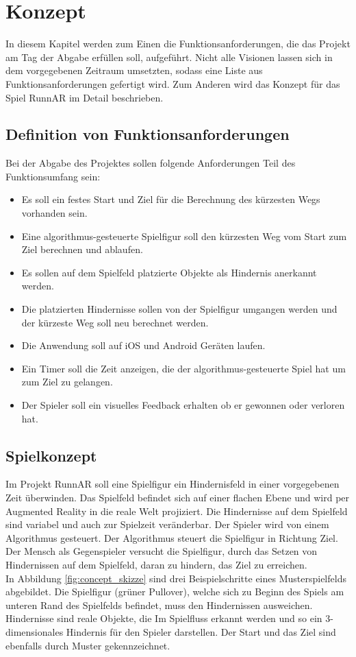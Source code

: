 \chapter{Konzept}
\label{sec:conzept}
In diesem Kapitel werden zum Einen die Funktionsanforderungen, die das Projekt am Tag der Abgabe erfüllen soll, aufgeführt. Nicht alle Visionen lassen sich in dem vorgegebenen Zeitraum umsetzten, sodass eine Liste aus Funktionsanforderungen gefertigt wird. Zum Anderen wird das Konzept für das Spiel RunnAR im Detail beschrieben.

\section{Definition von Funktionsanforderungen}
Bei der Abgabe des Projektes sollen folgende Anforderungen Teil des Funktionsumfang sein:
\begin{itemize}
\item Es soll ein festes Start und Ziel für die Berechnung des kürzesten Wegs vorhanden sein.
\item Eine algorithmus-gesteuerte Spielfigur soll den kürzesten Weg vom Start zum Ziel berechnen und ablaufen.
\item Es sollen auf dem Spielfeld platzierte Objekte als Hindernis anerkannt werden.
\item Die platzierten Hindernisse sollen von der Spielfigur umgangen werden und der kürzeste Weg soll neu berechnet werden.
\item Die Anwendung soll auf iOS und Android Geräten laufen.
\item Ein Timer soll die Zeit anzeigen, die der algorithmus-gesteuerte Spiel hat um zum Ziel  zu gelangen.
\item Der Spieler soll ein visuelles Feedback erhalten ob er gewonnen oder verloren hat.
\end{itemize}

\section{Spielkonzept}
Im Projekt RunnAR soll eine Spielfigur ein Hindernisfeld in einer vorgegebenen Zeit überwinden. Das Spielfeld befindet sich auf einer flachen Ebene und wird per Augmented Reality in die reale Welt projiziert. Die Hindernisse auf dem Spielfeld sind variabel und auch zur Spielzeit veränderbar. Der Spieler wird von einem Algorithmus gesteuert. Der Algorithmus steuert die Spielfigur in Richtung Ziel. Der Mensch als Gegenspieler versucht die Spielfigur, durch das Setzen von Hindernissen auf dem Spielfeld, daran zu hindern, das Ziel zu erreichen.\\
In Abbildung \ref{fig:concept_skizze} sind drei Beispielschritte eines Musterspielfelds abgebildet. Die Spielfigur (grüner Pullover), welche sich zu Beginn des Spiels am unteren Rand des Spielfelds befindet, muss den Hindernissen ausweichen. Hindernisse sind reale Objekte, die Im Spielfluss erkannt werden und so ein 3-dimensionales Hindernis für den Spieler darstellen. Der Start und das Ziel sind ebenfalls durch Muster gekennzeichnet. 

